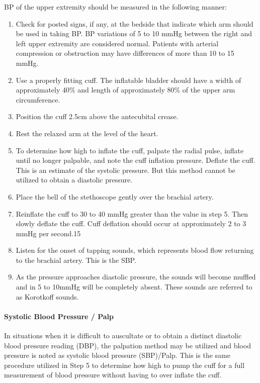 BP of the upper extremity should be measured in the following manner:
\begin{enumerate}
\item Check for posted signs, if any, at the bedside that indicate which arm should be used in taking BP. BP variations of 5 to 10 mmHg between the right and left upper extremity are considered normal. Patients with arterial compression or obstruction may have differences of more than 10 to 15 mmHg.
\item Use a properly fitting cuff. The inflatable bladder should have a width of approximately 40\% and length of approximately 80\% of the upper arm circumference.
\item Position the cuff 2.5cm above the antecubital crease.
\item Rest the relaxed arm at the level of the heart.
\item To determine how high to inflate the cuff, palpate the radial pulse, inflate until no longer palpable, and note the cuff inflation pressure. Deflate the cuff. This is an estimate of the systolic pressure. But this method cannot be utilized to obtain a diastolic pressure.
\item Place the bell of the stethoscope gently over the brachial artery.
\item Reinflate the cuff to 30 to 40 mmHg greater than the value in step 5. Then slowly deflate the cuff. Cuff deflation should occur at approximately 2 to 3 mmHg per second.15
\item Listen for the onset of tapping sounds, which represents blood flow returning to the brachial artery. This is the SBP.
\item As the pressure approaches diastolic pressure, the sounds will become muffled and in 5 to 10mmHg will be completely absent. These sounds are referred to as Korotkoff sounds.
\end{enumerate}

\paragraph{Systolic Blood Pressure / Palp}

In situations when it is difficult to auscultate or to obtain a distinct diastolic blood pressure reading (DBP), the palpation method may be utilized and blood pressure is noted as systolic blood pressure (SBP)/Palp. This is the same procedure utilized in Step 5 to determine how high to pump the cuff for a full measurement of blood pressure without having to over inflate the cuff.


